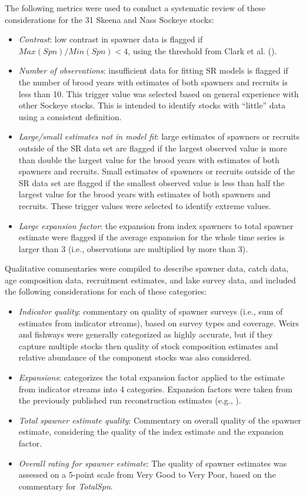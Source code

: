 \documentclass[french,11pt]{book}
\begin{document}
The following metrics were used to conduct a systematic review of these considerations for the 31 Skeena and Nass Sockeye stocks:
\begin{itemize}

\item
  \emph{Contrast}: low contrast in spawner data is flagged if \(Max(Spn)/Min(Spn) < 4\), using the threshold from Clark et al. ().\\
\item
  \emph{Number of observations}: insufficient data for fitting SR models is flagged if the number of brood years with estimates of both spawners and recruits is less than 10. This trigger value was selected based on general experience with other Sockeye stocks. This is intended to identify stocks with ``little'' data using a consistent definition.
\item
  \emph{Large/small estimates not in model fit}: large estimates of spawners or recruits outside of the SR data set are flagged if the largest observed value is more than double the largest value for the brood years with estimates of both spawners and recruits. Small estimates of spawners or recruits outside of the SR data set are flagged if the smallest observed value is less than half the largest value for the brood years with estimates of both spawners and recruits. These trigger values were selected to identify extreme values.
\item
  \emph{Large expansion factor}: the expansion from index spawners to total spawner estimate were flagged if the average expansion for the whole time series is larger than 3 (i.e., observations are multiplied by more than 3).
\end{itemize}
Qualitative commentaries were compiled to describe spawner data, catch data, age composition data, recruitment estimates, and lake survey data, and included the following considerations for each of these categories:
\begin{itemize}

\item
  \emph{Indicator quality}: commentary on quality of spawner surveys (i.e., sum of estimates from indicator streams), based on survey types and coverage. Weirs and fishways were generally categorized as highly accurate, but if they capture multiple stocks then quality of stock composition estimates and relative abundance of the component stocks was also considered.
\item
  \emph{Expansions}: categorizes the total expansion factor applied to the estimate from indicator streams into 4 categories. Expansion factors were taken from the previously published run reconstruction estimates (e.g., ).
\item
  \emph{Total spawner estimate quality}: Commentary on overall quality of the spawner estimate, considering the quality of the index estimate and the expansion factor.
\item
  \emph{Overall rating for spawner estimate}: The quality of spawner estimates was assessed on a 5-point scale from Very Good to Very Poor, based on the commentary for \emph{TotalSpn}.
\end{itemize}
\end{document}
